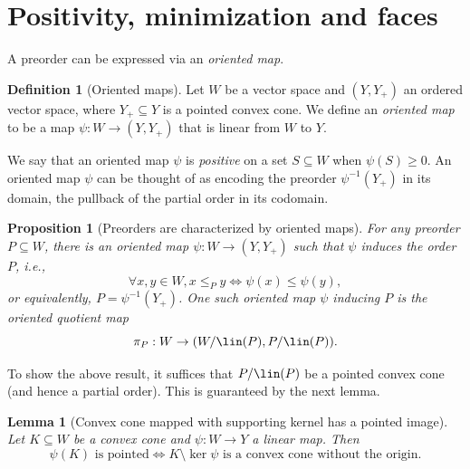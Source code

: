 \documentclass{article}
\theoremstyle{plain}
\newtheorem{lemma}[lemma]{Lemma}
\newtheorem{proposition}[proposition]{Proposition}
\theoremstyle{definition}
\newtheorem{definition}[definition]{Definition}
\theoremstyle{remark}
\begin{document}
\section{Positivity, minimization and faces}
\label{loc:body.positivity_minimization_and_faces}
A preorder can be expressed via an \emph{oriented map}.
\begin{definition}[Oriented maps]
\label{loc:oriented_maps.statement}
Let $W$ be a vector space and $(Y, Y_+)$ an ordered vector space,
where $Y_+ \subseteq Y$ is a pointed convex cone.
We define an \emph{oriented map} to be a map $\psi:W \to (Y, Y_+)$ that is linear
from $W$ to $Y$. 
\end{definition}
We say that an oriented map $\psi$ is \emph{positive} on a 
set $S \subseteq W$ when $\psi(S) \ge 0$. 
An oriented map $\psi$ can be thought of as encoding
the preorder $\psi^{-1}(Y_+)$ in its domain, the pullback of the partial order in its codomain.
\begin{proposition}[Preorders are characterized by oriented maps]
\label{loc:preorders_are_characterized_by_oriented_maps.statement}
For any preorder $P \subseteq W$, there is an oriented map $\psi:W \to (Y,Y_+)$ such that $\psi$ induces the order $P$, i.e., 
\begin{equation*}
\forall x,y \in W, x \le_{P}y \iff \psi(x) \le \psi(y),
\end{equation*}
or equivalently, $P = \psi^{-1}(Y_+)$.
One such oriented map $\psi$ inducing $P$ is the oriented quotient map 
\begin{equation*}
\pi_P:W \to (W/\lin(P),  P/\lin(P)).
\end{equation*}
\end{proposition}
To show the above result, it suffices that $P/ \lin(P)$ be a pointed convex cone
(and hence a partial order). This is guaranteed by the next lemma.
\begin{lemma}[Convex cone mapped with supporting kernel has a pointed image]
\label{loc:convex_cone_mapped_with_supporting_kernel_has_a_pointed_image.statement}
Let $K \subseteq W$ be a convex cone and $\psi:W \to Y$ a linear map. Then
\begin{equation*}
\psi(K) \text{ is pointed} \iff K \setminus \ker \psi \text{ is
a convex cone without the origin}.
\end{equation*}
\end{lemma}
\end{document}
